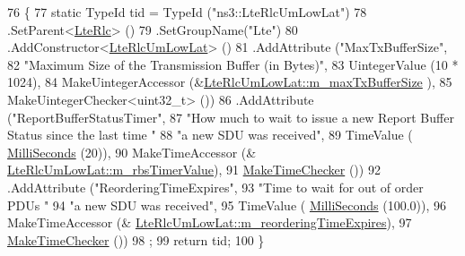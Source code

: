 \begin{DoxyCode}
76 \{
77   \textcolor{keyword}{static} TypeId tid = TypeId (\textcolor{stringliteral}{"ns3::LteRlcUmLowLat"})
78     .SetParent<\hyperlink{classns3_1_1LteRlc_a7204bd3f846a0f5d8c620cad57eceffd}{LteRlc}> ()
79     .SetGroupName(\textcolor{stringliteral}{"Lte"})
80     .AddConstructor<\hyperlink{classns3_1_1LteRlcUmLowLat_ac5434f9561de25c85ae4457c1db52189}{LteRlcUmLowLat}> ()
81     .AddAttribute (\textcolor{stringliteral}{"MaxTxBufferSize"},
82                    \textcolor{stringliteral}{"Maximum Size of the Transmission Buffer (in Bytes)"},
83                    UintegerValue (10 * 1024),
84                    MakeUintegerAccessor (&\hyperlink{classns3_1_1LteRlcUmLowLat_ae50ae79e638fbeadc0a89e7a4f4371e1}{LteRlcUmLowLat::m\_maxTxBufferSize}
      ),
85                    MakeUintegerChecker<uint32\_t> ())
86          .AddAttribute (\textcolor{stringliteral}{"ReportBufferStatusTimer"},
87                                                                         \textcolor{stringliteral}{"How much to wait to issue a new
       Report Buffer Status since the last time "}
88                                                                         \textcolor{stringliteral}{"a new SDU was received"},
89                                                                         TimeValue (
      \hyperlink{group__timecivil_gaf26127cf4571146b83a92ee18679c7a9}{MilliSeconds} (20)),
90                                                                         MakeTimeAccessor (&
      \hyperlink{classns3_1_1LteRlcUmLowLat_a5b3398ca6129f4450494f56a080b73ed}{LteRlcUmLowLat::m\_rbsTimerValue}),
91                                                                         
      \hyperlink{group__time_ga7032965bd4afa578691d88c09e4481c1}{MakeTimeChecker} ())
92          .AddAttribute (\textcolor{stringliteral}{"ReorderingTimeExpires"},
93                                                                         \textcolor{stringliteral}{"Time to wait for out of order PDUs
      "}
94                                                                         \textcolor{stringliteral}{"a new SDU was received"},
95                                                                         TimeValue (
      \hyperlink{group__timecivil_gaf26127cf4571146b83a92ee18679c7a9}{MilliSeconds} (100.0)),
96                                                                         MakeTimeAccessor (&
      \hyperlink{classns3_1_1LteRlcUmLowLat_a2850fb104c08957ef58e3c2fc7743aa7}{LteRlcUmLowLat::m\_reorderingTimeExpires}),
97                                                                         
      \hyperlink{group__time_ga7032965bd4afa578691d88c09e4481c1}{MakeTimeChecker} ())
98     ;
99   \textcolor{keywordflow}{return} tid;
100 \}
\end{DoxyCode}


